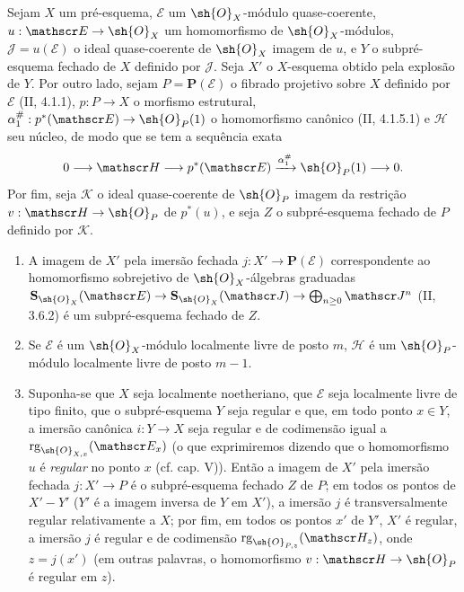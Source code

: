 \begin{proposition}[19.4.11]
\label{IV.19.4.11}
Sejam $X$ um pré-esquema, $\mathscr E$ um $\sh{O}_X$-módulo quase-coerente, $u:\mathscr E\to\sh{O}_X$ um homomorfismo de $\sh{O}_X$-módulos, $\mathscr J=u(\mathscr E)$ o ideal quase-coerente de $\sh{O}_X$ imagem de $u$, e $Y$ o subpré-esquema fechado de $X$ definido por $\mathscr J$. Seja $X'$ o $X$-esquema obtido pela explosão de $Y$. Por outro lado, sejam $P=\mathbf P(\mathscr E)$ o fibrado projetivo sobre $X$ definido por $\mathscr E$ (II, 4.1.1), $p:P\to X$ o morfismo estrutural, $\alpha_1^{\#}:p^*(\mathscr E)\to\sh{O}_P(1)$ o homomorfismo canônico (II, 4.1.5.1) e $\mathscr H$ seu núcleo, de modo que se tem a sequência exata
\[
  0\longrightarrow\mathscr H\longrightarrow p^*(\mathscr E)\xrightarrow{\alpha_1^{\#}}\sh{O}_P(1)\longrightarrow0.
\]
Por fim, seja $\mathscr K$ o ideal quase-coerente de $\sh{O}_P$ imagem da restrição $v:\mathscr H\to\sh{O}_P$ de $p^*(u)$, e seja $Z$ o subpré-esquema fechado de $P$ definido por $\mathscr K$.


\begin{enumerate}
  \item[(i)] A imagem de $X'$ pela imersão fechada $j:X'\to\mathbf P(\mathscr E)$ correspondente ao homomorfismo sobrejetivo de $\sh{O}_X$-álgebras graduadas $\mathbf S_{\sh{O}_X}(\mathscr E)\to\mathbf S_{\sh{O}_X}(\mathscr J)\to\bigoplus_{n\geq0}\mathscr J^n$ (II, 3.6.2) é um subpré-esquema fechado de $Z$.
  \item[(ii)] Se $\mathscr E$ é um $\sh{O}_X$-módulo localmente livre de posto $m$, $\mathscr H$ é um $\sh{O}_P$-módulo localmente livre de posto $m-1$.
  \item[(iii)] Suponha-se que $X$ seja localmente noetheriano, que $\mathscr E$ seja localmente livre de tipo finito, que o subpré-esquema $Y$ seja regular e que, em todo ponto $x\in Y$, a imersão canônica $i:Y\to X$ seja regular e de codimensão igual a $\operatorname{rg}_{\sh{O}_{X,x}}(\mathscr E_x)$ (o que exprimiremos dizendo que o homomorfismo $u$ é \emph{regular} no ponto $x$ (cf. cap. V)). Então a imagem de $X'$ pela imersão fechada $j:X'\to P$ é o subpré-esquema fechado $Z$ de $P$; em todos os pontos de $X'-Y'$ ($Y'$ é a imagem inversa de $Y$ em $X'$), a imersão $j$ é transversalmente regular relativamente a $X$; por fim, em todos os pontos $x'$ de $Y'$, $X'$ é regular, a imersão $j$ é regular e de codimensão $\operatorname{rg}_{\sh{O}_{P,z}}(\mathscr H_z)$, onde $z=j(x')$ (em outras palavras, o homomorfismo $v:\mathscr H\to\sh{O}_P$ é regular em $z$).
\end{enumerate}
\end{proposition}

